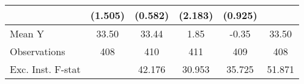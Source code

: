 {\begin{tabular}{l*{5}{c}}
            &     (1.505)         &     (0.582)         &     (2.183)         &     (0.925)         &                     \\
\midrule
Mean Y      &       33.50         &       33.44         &        1.85         &       -0.35         &       33.50         \\
Observations&         408         &         410         &         411         &         409         &         408         \\
Exc. Inst. F-stat&                     &      42.176         &      30.953         &      35.725         &      51.871         \\
\bottomrule
\end{tabular}
}

